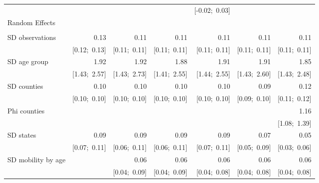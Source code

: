 \begin{sidewaystable}[htp]
\begin{center}
{\begin{tabular}{l D{.}{.}{6.11} D{.}{.}{6.11} D{.}{.}{6.11} D{.}{.}{6.11} D{.}{.}{6.11} D{.}{.}{6.11} }
                               &                 &                 &                 & [-0.02;\ 0.03]  &                 &                 \\
Random Effects                 &                 &                 &                 &                 &                 &                 \\
                               &                 &                 &                 &                 &                 &                 \\
\quad SD observations          & 0.13            & 0.11            & 0.11            & 0.11            & 0.11            & 0.11            \\
                               & [0.12;\ 0.13]   & [0.11;\ 0.11]   & [0.11;\ 0.11]   & [0.11;\ 0.11]   & [0.11;\ 0.11]   & [0.11;\ 0.11]   \\
\quad SD age group             & 1.92            & 1.92            & 1.88            & 1.91            & 1.91            & 1.85            \\
                               & [1.43;\ 2.57]   & [1.43;\ 2.73]   & [1.41;\ 2.55]   & [1.44;\ 2.55]   & [1.43;\ 2.60]   & [1.43;\ 2.48]   \\
\quad SD counties              & 0.10            & 0.10            & 0.10            & 0.10            & 0.09            & 0.12            \\
                               & [0.10;\ 0.10]   & [0.10;\ 0.10]   & [0.10;\ 0.10]   & [0.10;\ 0.10]   & [0.09;\ 0.10]   & [0.11;\ 0.12]   \\
\quad Phi counties             &                 &                 &                 &                 &                 & 1.16            \\
                               &                 &                 &                 &                 &                 & [1.08;\ 1.39]   \\
\quad SD states                & 0.09            & 0.09            & 0.09            & 0.09            & 0.07            & 0.05            \\
                               & [0.07;\ 0.11]   & [0.06;\ 0.11]   & [0.06;\ 0.11]   & [0.07;\ 0.11]   & [0.05;\ 0.09]   & [0.03;\ 0.06]   \\
\quad SD mobility by age       &                 & 0.06            & 0.06            & 0.06            & 0.06            & 0.06            \\
                               &                 & [0.04;\ 0.09]   & [0.04;\ 0.09]   & [0.04;\ 0.08]   & [0.04;\ 0.08]   & [0.04;\ 0.08]   \\

\end{tabular}}
\end{center}
\end{sidewaystable}
